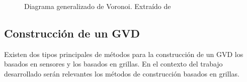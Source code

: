 \begin{figure}[H]
  \centering
  \qquad
  \caption{Diagrama generalizado de Voronoi. Extraído de \cite{Wallgrun2005}}
  \label{cleanup}
\end{figure}

\subsection{Construcción de un GVD}\label{subsec:constGVD}
Existen dos tipos principales de métodos para la construcción de un GVD los basados en sensores y los basados en grillas. En el contexto del trabajo desarrollado serán relevantes los métodos de construcción basados en grillas. 

